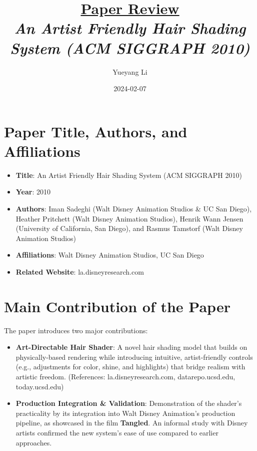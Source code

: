 \documentclass[12pt]{article}
\newcommand{\paperTitle}{
    \textit{\normalsize{An Artist Friendly Hair Shading System (ACM SIGGRAPH 2010)}}  
}
\begin{document}
\title{\Large\uline{\textbf{Paper Review}} \\[0.4em]
\paperTitle{} 
}
\author{Yueyang Li}
\date{2024-02-07}

\maketitle

\section{Paper Title, Authors, and Affiliations}
\begin{itemize}[noitemsep]
    \item \textbf{Title}: An Artist Friendly Hair Shading System (ACM SIGGRAPH 2010)
    \item \textbf{Year}: 2010
    \item \textbf{Authors}: Iman Sadeghi (Walt Disney Animation Studios \& UC San Diego), Heather Pritchett (Walt Disney Animation Studios), Henrik Wann Jensen (University of California, San Diego), and Rasmus Tamstorf (Walt Disney Animation Studios)
    \item \textbf{Affiliations}: Walt Disney Animation Studios, UC San Diego
    \item \textbf{Related Website}: la.disneyresearch.com
\end{itemize}

\section{Main Contribution of the Paper}
The paper introduces two major contributions:
\begin{itemize}[noitemsep]
    \item \textbf{Art-Directable Hair Shader}: A novel hair shading model that builds on physically-based rendering while introducing intuitive, artist-friendly controls (e.g., adjustments for color, shine, and highlights) that bridge realism with artistic freedom. (References: la.disneyresearch.com, datarepo.ucsd.edu, today.ucsd.edu)
    \item \textbf{Production Integration \& Validation}: Demonstration of the shader's practicality by its integration into Walt Disney Animation's production pipeline, as showcased in the film \textbf{Tangled}. An informal study with Disney artists confirmed the new system's ease of use compared to earlier approaches.
\end{itemize}
\end{document}
